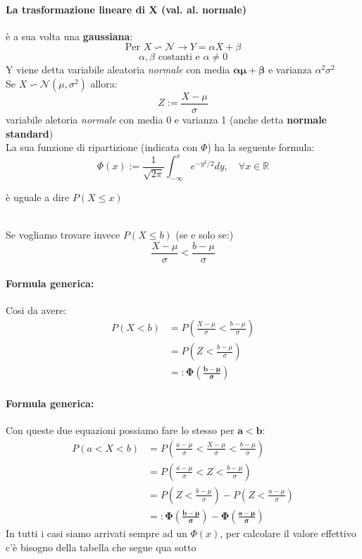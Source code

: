 \documentclass[]{article}
\newcommand{\formula}{\paragraph{Formula generica:}}
\begin{document}
    \paragraph{La trasformazione lineare di X (val. al. normale)} è a sua volta una \textbf{gaussiana}:
    \[ \text{Per } X \backsim \mathcal{N} \longrightarrow Y = \alpha X + \beta \]
    \[ \alpha, \beta \text{ costanti e } \alpha \not= 0\]
    Y viene detta variabile aleatoria \textit{normale} con media $\boldsymbol{\alpha \mu + \beta}$ e varianza $\alpha^2 \sigma^2$ \\
    Se $X \backsim \mathcal{N}(\mu, \sigma^2)$ allora:
    \[ Z := \frac{X - \mu}{\sigma}\]
    variabile aletoria \textit{normale} con media 0 e varianza 1 (anche detta \textbf{normale standard}) \\
    La sua funzione di ripartizione (indicata con $\Phi$) ha la seguente formula:
    \begin{equation*}
        \Phi(x):=\frac{1}{\sqrt{2 \pi}} \int_{-\infty}^x e^{-y^2 / 2} d y, \quad \forall x \in \mathbb{R}
    \end{equation*}
    \centerline{è uguale a dire $P(X \leq x)$} \\
    \linebreak[4]
    Se vogliamo trovare invece $P(X \leq b)$ (se e solo se:)
    \[ \frac{X - \mu}{\sigma} < \frac{b - \mu}{\sigma}\]
    \formula Cosi da avere: 
    \begin{equation*}
        \begin{split}
            P(X < b) &= P(\frac{X - \mu}{\sigma} < \frac{b - \mu}{\sigma}) \\
            &= P(Z < \frac{b - \mu}{\sigma}) \\
            & =: \boldsymbol{\Phi(\frac{b - \mu}{\sigma})}
        \end{split}
    \end{equation*}

    \formula Con queste due equazioni possiamo fare lo stesso per $\boldsymbol{a < b}$:
    \begin{equation*}
        \begin{split}
            P(a < X < b) &= P(\frac{a - \mu}{\sigma} < \frac{X - \mu}{\sigma} < \frac{b - \mu}{\sigma}) \\
            &= P(\frac{a - \mu}{\sigma} < Z < \frac{b - \mu}{\sigma}) \\
            &= P(Z < \frac{b - \mu}{\sigma}) - P(Z < \frac{a - \mu}{\sigma}) \\
            &=: \boldsymbol{\Phi (\frac{b - \mu}{\sigma}) - \Phi(\frac{a - \mu}{\sigma})}
        \end{split}
    \end{equation*}
    In tutti i casi siamo arrivati sempre ad un $\Phi(x)$, per calcolare il valore effettivo c'è bisogno della tabella che segue qua sotto
\end{document}
